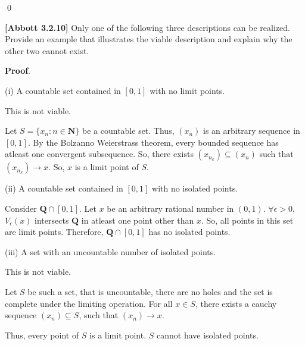 \documentclass[10pt]{article}
\begin{document}
\qed 

\textbf{[Abbott 3.2.10] }Only one of the following three descriptions can be realized. Provide an example that illustrates the viable description and explain why the other two cannot exist.



\textbf{Proof}.



(i) A countable set contained in $\displaystyle [ 0,1]$ with no limit points.



This is not viable.



Let $\displaystyle S=\{x_{n} :n\in \mathbf{N}\}$ be a countable set. Thus, $\displaystyle ( x_{n})$ is an arbitrary sequence in $\displaystyle [ 0,1]$. By the Bolzanno Weierstrass theorem, every bounded sequence has atleast one convergent subsequence. So, there exists $\displaystyle ( x_{n_{k}}) \subseteq ( x_{n})$ such that $\displaystyle ( x_{n_{k}})\rightarrow x$. So, $\displaystyle x$ is a limit point of $\displaystyle S$.



(ii) A countable set contained in $\displaystyle [ 0,1]$ with no isolated points.



Consider $\displaystyle \mathbf{Q} \cap [ 0,1]$. Let $\displaystyle x$ be an arbitrary rational number in $\displaystyle ( 0,1)$. $\displaystyle \forall \epsilon  >0$, $\displaystyle V_{\epsilon }( x)$ intersects $\displaystyle \mathbf{Q}$ in atleast one point other than $\displaystyle x$. So, all points in this set are limit points. Therefore, $\displaystyle \mathbf{Q} \cap [ 0,1]$ has no isolated points.



(iii) A set with an uncountable number of isolated points.

 

This is not viable.



Let $\displaystyle S$ be such a set, that is uncountable, there are no holes and the set is complete under the limiting operation. For all $\displaystyle x\in S$, there exists a cauchy sequence $\displaystyle ( x_{n}) \subseteq S$, such that $\displaystyle ( x_{n})\rightarrow x$. 



Thus, every point of $\displaystyle S$ is a limit point. $\displaystyle S$ cannot have isolated points. 
\end{document}
